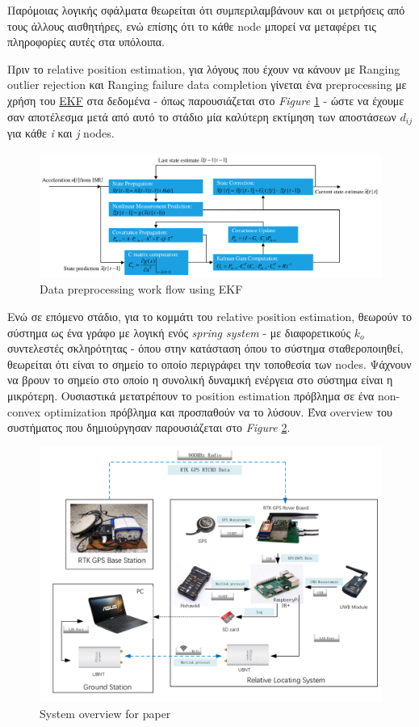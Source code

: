 Παρόμοιας λογικής σφάλματα θεωρείται ότι συμπεριλαμβάνουν και οι μετρήσεις από
τους άλλους αισθητήρες, ενώ επίσης ότι το κάθε node μπορεί να μεταφέρει τις πληροφορίες 
αυτές στα υπόλοιπα.

Πριν το relative position estimation, για λόγους που έχουν να κάνουν με 
Ranging outlier rejection και Ranging failure data completion γίνεται ένα 
preprocessing με χρήση του \hyperref[abbr:EKF]{EKF} στα δεδομένα - όπως 
παρουσιάζεται στο \emph{Figure} \ref{fig:Data-preprocessing-work-flow-using-EKF} -
ώστε να έχουμε σαν αποτέλεσμα μετά από αυτό το στάδιο μία καλύτερη εκτίμηση των αποστάσεων $d_{ij}$ 
για κάθε \emph{i} και \emph{j} nodes. 

\begin{figure} [H]
	\centering
	\includegraphics[width=\linewidth]{Images/Related-Work/Data-preprocessing-work-flow-using-EKF.png}
	\decoRule
	\caption[Data preprocessing work flow using EKF]{Data preprocessing work flow using EKF\cite{uwb-imu-gps1}}
	\label{fig:Data-preprocessing-work-flow-using-EKF}
\end{figure}

Ενώ σε επόμενο στάδιο, για το κομμάτι του relative position estimation, θεωρούν το σύστημα ως ένα γράφο 
με λογική ενός \emph{spring system} - με διαφορετικούς $k_o$ συ\-ντε\-λεστές σκληρότητας - όπου στην κατάσταση 
όπου το σύστημα σταθεροποιηθεί, θεωρείται ότι είναι το σημείο
το οποίο περιγράφει την τοποθεσία των nodes. Ψάχνουν να βρουν το σημείο στο οποίο η συνολική δυναμική ενέργεια 
στο σύστημα είναι η μικρότερη. Ουσιαστικά μετατρέπουν το position estimation πρόβλημα σε ένα 
non-convex optimization πρόβλημα και προσπαθούν να το λύσουν. Ένα overview του συστήματος που δημιούργησαν 
παρουσιάζεται στο \emph{Figure} \ref{fig:paper1-overview}.

\begin{figure} [H]
	\centering
	\includegraphics[width=0.69
	\linewidth]{Images/Related-Work/UAV-swarm-system-diagram.png}
	\decoRule
	\caption[System overview]{System overview for paper \cite{uwb-imu-gps1}}
	\label{fig:paper1-overview}
\end{figure}


